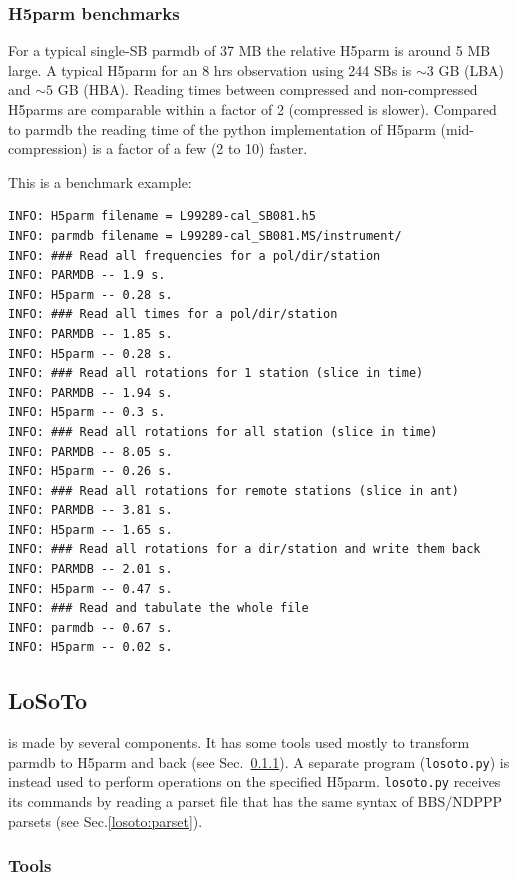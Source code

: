 \documentclass[]{article}
\begin{document}
\subsubsection{H5parm benchmarks}

For a typical single-SB parmdb of 37 MB the relative H5parm is around 5 MB large. A typical H5parm for an 8 hrs observation using 244 SBs is $\sim 3$ GB (LBA) and $\sim 5$ GB (HBA). Reading times between compressed and non-compressed H5parms are comparable within a factor of 2 (compressed is slower). Compared to parmdb the reading time of the python implementation of H5parm (mid-compression) is a factor of a few (2 to 10) faster.

This is a benchmark example:

\begin{verbatim}
INFO: H5parm filename = L99289-cal_SB081.h5
INFO: parmdb filename = L99289-cal_SB081.MS/instrument/
INFO: ### Read all frequencies for a pol/dir/station
INFO: PARMDB -- 1.9 s.
INFO: H5parm -- 0.28 s.
INFO: ### Read all times for a pol/dir/station
INFO: PARMDB -- 1.85 s.
INFO: H5parm -- 0.28 s.
INFO: ### Read all rotations for 1 station (slice in time)
INFO: PARMDB -- 1.94 s.
INFO: H5parm -- 0.3 s.
INFO: ### Read all rotations for all station (slice in time)
INFO: PARMDB -- 8.05 s.
INFO: H5parm -- 0.26 s.
INFO: ### Read all rotations for remote stations (slice in ant)
INFO: PARMDB -- 3.81 s.
INFO: H5parm -- 1.65 s.
INFO: ### Read all rotations for a dir/station and write them back
INFO: PARMDB -- 2.01 s.
INFO: H5parm -- 0.47 s.
INFO: ### Read and tabulate the whole file
INFO: parmdb -- 0.67 s.
INFO: H5parm -- 0.02 s.
\end{verbatim}

\subsection{LoSoTo}
\label{losoto:overview}

\losoto{} is made by several components. It has some tools used mostly to transform parmdb to H5parm and back (see Sec.~\ref{losoto:tools}). A separate program (\texttt{losoto.py}) is instead used to perform operations on the specified H5parm. \texttt{losoto.py} receives its commands by reading a parset file that has the same syntax of BBS/NDPPP parsets (see Sec.\ref{losoto:parset}).

\subsubsection{Tools}
\label{losoto:tools}
\end{document}
